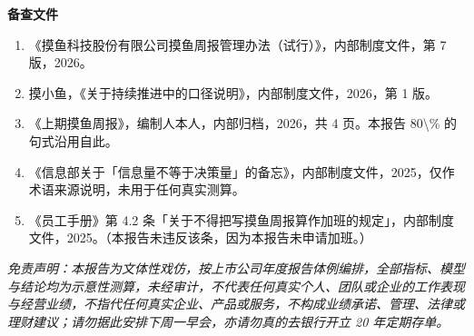 \documentclass[11pt,a4paper]{article}
\begin{document}
\noindent\textbf{备查文件}\par
\begin{enumerate}
\item 《摸鱼科技股份有限公司摸鱼周报管理办法（试行）》，内部制度文件，第 7 版，2026。
\item 摸小鱼，《关于持续推进中的口径说明》，内部制度文件，2026，第 1 版。
\item 《上期摸鱼周报》，编制人本人，内部归档，2026，共 4 页。本报告 80\textbackslash{}\% 的句式沿用自此。
\item 《信息部关于「信息量不等于决策量」的备忘》，内部制度文件，2025，仅作术语来源说明，未用于任何真实测算。
\item 《员工手册》第 4.2 条「关于不得把写摸鱼周报算作加班的规定」，内部制度文件，2025。（本报告未违反该条，因为本报告未申请加班。）
\end{enumerate}

\noindent\textit{免责声明：本报告为文体性戏仿，按上市公司年度报告体例编排，全部指标、模型与结论均为示意性测算，未经审计，不代表任何真实个人、团队或企业的工作表现与经营业绩，不指代任何真实企业、产品或服务，不构成业绩承诺、管理、法律或理财建议；请勿据此安排下周一早会，亦请勿真的去银行开立 20 年定期存单。}
\end{document}
